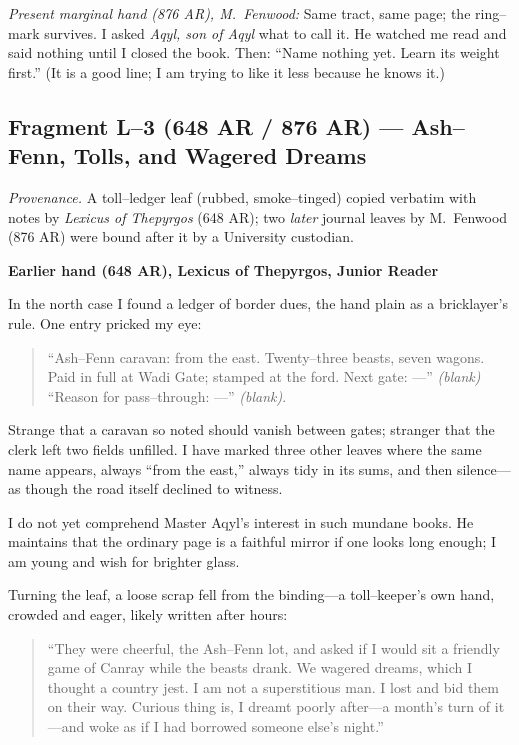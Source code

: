 \documentclass[11pt]{article}
\begin{document}
\medskip
\noindent\textit{Present marginal hand (876 AR), M.\ Fenwood:} Same tract, same page; the ring–mark survives. I asked \textit{Aqyl, son of Aqyl} what to call it. He watched me read and said nothing until I closed the book. Then: “Name nothing yet. Learn its weight first.” (It is a good line; I am trying to like it less because he knows it.)

\subsection{Fragment L--3 (648 AR / 876 AR) — Ash–Fenn, Tolls, and Wagered Dreams}
\label{frag:l3}

\noindent\textit{Provenance.} A toll–ledger leaf (rubbed, smoke–tinged) copied verbatim with notes by \textit{Lexicus of Thepyrgos} (648 AR); two \textit{later} journal leaves by M.\ Fenwood (876 AR) were bound after it by a University custodian.

\medskip
\noindent\textbf{Earlier hand (648 AR), Lexicus of Thepyrgos, Junior Reader}

In the north case I found a ledger of border dues, the hand plain as a bricklayer’s rule. One entry pricked my eye:

\begin{quote}\small
“Ash–Fenn caravan: from the east. Twenty–three beasts, seven wagons. Paid in full at Wadi Gate; stamped at the ford. Next gate: —” \textit{(blank)} “Reason for pass–through: —” \textit{(blank)}.
\end{quote}

Strange that a caravan so noted should vanish between gates; stranger that the clerk left two fields unfilled. I have marked three other leaves where the same name appears, always “from the east,” always tidy in its sums, and then silence—as though the road itself declined to witness.

I do not yet comprehend Master Aqyl’s interest in such mundane books. He maintains that the ordinary page is a faithful mirror if one looks long enough; I am young and wish for brighter glass.

Turning the leaf, a loose scrap fell from the binding—a toll–keeper’s own hand, crowded and eager, likely written after hours:

\begin{quote}\small
“They were cheerful, the Ash–Fenn lot, and asked if I would sit a friendly game of Canray while the beasts drank. We wagered dreams, which I thought a country jest. I am not a superstitious man. I lost and bid them on their way. Curious thing is, I dreamt poorly after—a month’s turn of it—and woke as if I had borrowed someone else’s night.”
\end{quote}
\end{document}
